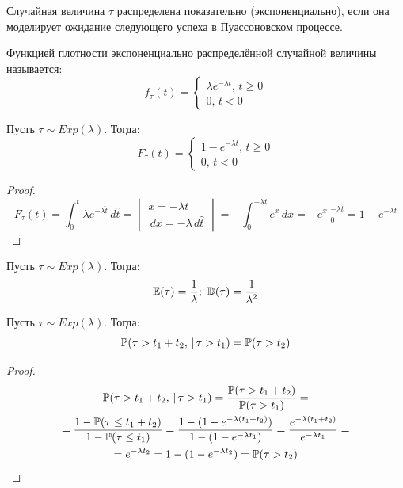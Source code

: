 \documentclass[12pt]{article}
\begin{document}
\begin{definition}
    Случайная величина $\tau$ распределена показательно (экспоненциально), если она моделирует ожидание следующего успеха в Пуассоновском процессе.
\end{definition}
\begin{definition}
    Функцией плотности экспоненциально распределённой случайной величины называется:
    $$f_\tau(t)=\begin{cases}
        \lambda e^{-\lambda t},\,t\geq 0\\
        0,\,t<0
    \end{cases}$$
\end{definition}
\begin{statement}
    Пусть $\tau\sim Exp(\lambda)$. Тогда:
    $$F_\tau(t)=\begin{cases}
        1-e^{-\lambda t},\,t\geq 0\\
        0,\,t<0
    \end{cases}$$
\end{statement}
\begin{proof}
    $$F_\tau(t)=\int_{0}^{t}\lambda e^{-\lambda \hat{t}}\,d \hat{t}=\begin{vmatrix}
    x=-\lambda t\\
    \,d x=-\lambda\,d \hat{t}
    \end{vmatrix}=-\int_{0}^{-\lambda t}e^x\,d x=-e^x\Big|_0^{-\lambda t}=1-e^{-\lambda t}$$
\end{proof}
\begin{statement}
    Пусть $\tau\sim Exp(\lambda)$. Тогда:
    $$\mathbb{E}(\tau)=\frac{1}{\lambda};\,\,\mathbb{D}(\tau)=\frac{1}{\lambda^2}$$
\end{statement}
\begin{statement}
    Пусть $\tau\sim Exp(\lambda)$. Тогда:
    $$\mathbb{P}(\tau>t_1+t_2,\,|\,\tau>t_1)=\mathbb{P}(\tau>t_2)$$
\end{statement}
\begin{proof}
    \begin{multline*}
        \mathbb{P}(\tau>t_1+t_2,\,|\,\tau>t_1)=\frac{\mathbb{P}(\tau>t_1+t_2)}{\mathbb{P}(\tau>t_1)}=\\=\frac{1-\mathbb{P}(\tau\leq t_1+t_2)}{1-\mathbb{P}(\tau\leq t_1)}=\frac{1-(1-e^{-\lambda(t_1+t_2)})}{1-(1-e^{-\lambda t_1})}=\frac{e^{-\lambda(t_1+t_2)}}{e^{-\lambda t_1}}=\\=e^{-\lambda t_2}=1-(1-e^{-\lambda t_2})=\mathbb{P}(\tau>t_2)
    \end{multline*}
\end{proof}
\end{document}
